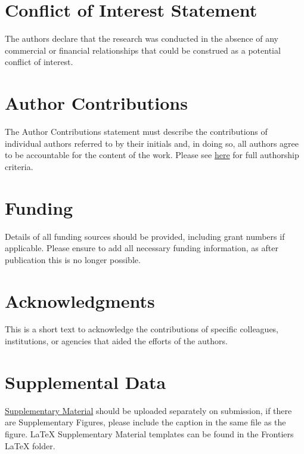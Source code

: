 \documentclass[utf8]{style/FrontiersinHarvard}
\begin{document}
\section*{Conflict of Interest Statement}
The authors declare that the research was conducted in the absence of any commercial or financial relationships that could be construed as a potential conflict of interest.

\section*{Author Contributions}
The Author Contributions statement must describe the contributions of individual authors referred to by their initials and, in doing so, all authors agree to be accountable for the content of the work.
Please see \href{https://www.frontiersin.org/about/policies-and-publication-ethics#AuthorshipAuthorResponsibilities}{here} for full authorship criteria.

\section*{Funding}
Details of all funding sources should be provided, including grant numbers if applicable.
Please ensure to add all necessary funding information, as after publication this is no longer possible.

\section*{Acknowledgments}
This is a short text to acknowledge the contributions of specific colleagues, institutions, or agencies that aided the efforts of the authors.

\section*{Supplemental Data}
 \href{http://home.frontiersin.org/about/author-guidelines#SupplementaryMaterial}{Supplementary Material} should be uploaded separately on submission, if there are Supplementary Figures, please include the caption in the same file as the figure. LaTeX Supplementary Material templates can be found in the Frontiers LaTeX folder.



\end{document}
